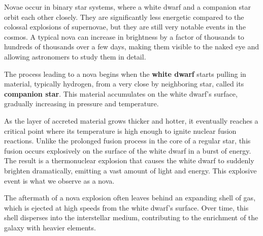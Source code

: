 Novae occur in binary star systems, where a white dwarf and a companion star orbit each other closely. They are significantly less energetic compared to the colossal explosions of supernovae, but they are still very notable events in the cosmos. A typical nova can increase in brightness by a factor of thousands to hundreds of thousands over a few days, making them visible to the naked eye and allowing astronomers to study them in detail.

The process leading to a nova begins when the \textbf{white dwarf} starts pulling in material, typically hydrogen, from a very close by neighboring star, called its \textbf{companion star}. This material accumulates on the white dwarf's surface, gradually increasing in pressure and temperature.

As the layer of accreted material grows thicker and hotter, it eventually reaches a critical point where its temperature is high enough to ignite nuclear fusion reactions. Unlike the prolonged fusion process in the core of a regular star, this fusion occurs explosively on the surface of the white dwarf in a burst of energy. The result is a thermonuclear explosion that causes the white dwarf to suddenly brighten dramatically, emitting a vast amount of light and energy. This explosive event is what we observe as a nova.

The aftermath of a nova explosion often leaves behind an expanding shell of gas, which is ejected at high speeds from the white dwarf's surface. Over time, this shell disperses into the interstellar medium, contributing to the enrichment of the galaxy with heavier elements.
